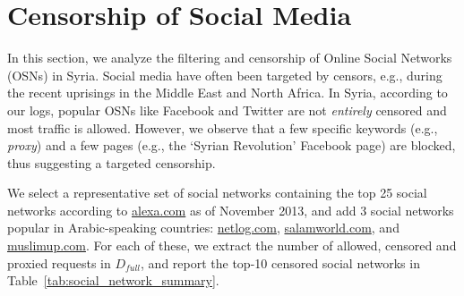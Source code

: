 \documentclass{sig-alternate-2013}
\def\df{$D_{full}$\xspace}
\begin{document}
 













\section{Censorship of Social Media}
\label{sec:social_media}


        
In this section, we analyze the filtering and censorship of Online Social Networks (OSNs) in Syria. Social media have often been targeted by censors, e.g., during the recent uprisings in the Middle East and North Africa. In Syria, according to our logs, popular OSNs like Facebook and Twitter are not \textit{entirely} censored and most traffic is allowed. However, we observe that a few specific keywords (e.g., \emph{proxy}) and a few pages (e.g., the `Syrian Revolution' Facebook page) are blocked, thus suggesting a targeted censorship.



We select a representative set of social networks containing the top 25 social networks according to \url{alexa.com} as of November 2013, and add 3 social networks popular in Arabic-speaking countries: \url{netlog.com}, \url{salamworld.com}, and \url{muslimup.com}. For each of these, we extract the number of allowed, censored and proxied requests in \df, and report the top-10 censored social networks 
in Table~\ref{tab:social_network_summary}. 
\end{document}
